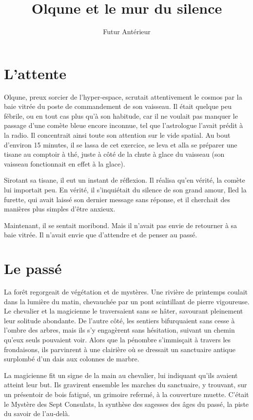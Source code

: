 \documentclass[a4paper,11pt, openany]{book}
\title{Olqune et le mur du silence}
\author{Futur Antérieur}
\date{}
\begin{document}
\maketitle

\chapter{L'attente}
Olqune, preux sorcier de l'hyper-espace, scrutait attentivement le cosmos par la baie vitrée du poste de commandement de son vaisseau.
Il était quelque peu fébrile, ou en tout cas plus qu'à son habitude, car il ne voulait pas manquer le passage d'une comète bleue encore inconnue, tel que l'astrologue l'avait prédit à la radio.
Il concentrait ainsi toute son attention sur le vide spatial. Au bout d'environ 15 minutes, il se lassa de cet exercice, se leva 
et alla se préparer une tisane au comptoir à thé, juste à côté de la chute à glace du vaisseau (son vaisseau fonctionnait en effet à la glace).

Sirotant sa tisane, il eut un instant de réflexion. Il réalisa qu'en vérité, la comète lui importait peu.
En vérité, il s'inquiétait du silence de son grand amour, Iled la furette, qui avait laissé son dernier message sans réponse, et il cherchait des manières plus simples d'être anxieux.

Maintenant, il se sentait moribond. Mais il n'avait pas envie de retourner à sa baie vitrée. Il n'avait envie que d'attendre et de penser au passé.

\chapter{Le passé}
La forêt regorgeait de végétation et de mystères. Une rivière de printemps coulait dans la lumière du matin, chevauchée par un pont scintillant de pierre vigoureuse.
Le chevalier et la magicienne le traversaient sans se hâter, savourant pleinement leur solitude abondante. 
De l'autre côté, les sentiers bifurquaient sans cesse à l'ombre des arbres, mais ils s'y engagèrent sans hésitation, suivant un chemin qu'eux seuls pouvaient voir.
Alors que la pénombre s'immisçait à travers les frondaisons, ils parvinrent à une clairière où se dressait un sanctuaire antique surplombé d'un dais aux colonnes de marbre. 

La magicienne fit un signe de la main au chevalier, lui indiquant qu'ils avaient atteint leur but. 
Ils gravirent ensemble les marches du sanctuaire, y trouvant, sur un présentoir de bois fatigué, un grimoire refermé, à la couverture muette.
C'était le Mystère des Sept Consulats, la synthèse des sagesses des âges du passé, la piste du savoir de l'au-delà.
\end{document}
